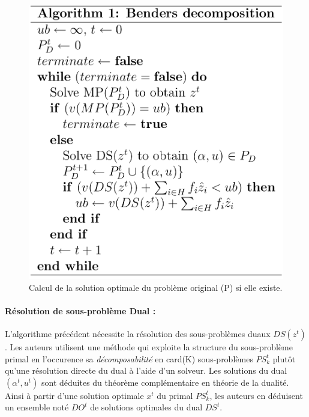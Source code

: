 \begin{figure}[H]
	\begin{center}	
		\includegraphics[scale=0.3]{images/alg1}
		\caption{Calcul de la solution optimale du problème original (P) si elle existe.}
		\label{alg1}
	\end{center}
\end{figure}


  \paragraph{Résolution de sous-problème Dual :}

L'algorithme précédent nécessite la résolution des sous-problèmes duaux $DS(z^t)$. Les auteurs utilisent une méthode qui exploite la structure du sous-problème primal en l'occurence sa \textit{décomposabilité} en card(K) sous-problèmes $PS^t_k $ plutôt qu'une résolution directe du dual à l'aide d'un solveur. Les solutions du dual $(\alpha^t, u^t)$ sont déduites du théorème complémentaire en théorie de la dualité. Ainsi à partir d'une solution optimale $x^t$ du primal $PS^t_k$, les auteurs en déduisent un ensemble noté $DO^t$ de solutions optimales du dual $DS^t$.

